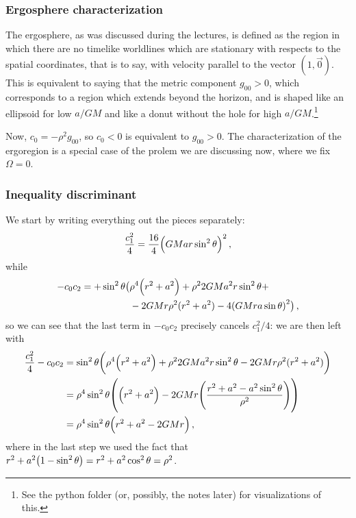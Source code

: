 \documentclass[main.tex]{subfiles}
\begin{document}
\subsubsection{Ergosphere characterization}

The ergosphere, as was discussed during the lectures, is defined as the region in which there are no timelike worldlines which are stationary with respects to the spatial coordinates, that is to say, with velocity parallel to the vector \((1, \vec{0})\).
This is equivalent to saying that the metric component \(g_{00} > 0\), which corresponds to a region which extends beyond the horizon, and is shaped like an ellipsoid for low \(a/GM\) and like a donut without the hole for high \(a/ GM\).\footnote{See the python folder (or, possibly, the notes later) for visualizations of this.}

Now, \(c_0 = - \rho^2 g_{00} \), so \(c_0 < 0\) is equivalent to \(g_{00} > 0\). 
The characterization of the ergoregion is a special case of the prolem we are discussing now, where we fix \(\Omega = 0\).

\subsubsection{Inequality discriminant}

We start by writing everything out the pieces separately: 
%
\begin{align}
  \frac{c_1^2}{4} = 
  \frac{16}{4} \qty(GMar \sin^2\theta)^2 
\,,
\end{align}
%
while
%
\begin{align}
\begin{split}
    - c_0 c_2  = 
    + \sin^2\theta  \big(&\rho^{4} \qty(r^2+a^2) + \rho^2 2 GMa^2 r \sin^2\theta +\\
    &- 2GMr \rho^2 (r^2+a^2) - 4 \qty(GMra \sin \theta )^2\big)
    \,,
\end{split}
\end{align}
%
so we can see that the last term in \(- c_0 c_2 \) precisely cancels \(c_1 ^2 /4\): we are then left with 
%
\begin{align}
  \frac{c_1^2}{4}-c_0 c_2 &= \sin^2 \theta \qty(\rho^{4} \qty(r^2+a^2) + \rho^2 2 GMa^2 r \sin^2\theta 
  - 2GMr \rho^2 (r^2+a^2))  \\
  &= \rho^{4} \sin^2\theta \qty(\qty(r^2+a^2) - 2GMr \qty(\frac{r^2+a^2 - a^2 \sin^2\theta }{\rho^2}))  \\
  &= \rho^{4} \sin^2\theta \qty(r^2+a^2-2GMr)
\,,
\end{align}
%
where in the last step we used the fact that \(r^2+a^2 \qty(1 - \sin^2\theta ) = r^2+a^2 \cos^2\theta = \rho^2\). 
\end{document}
